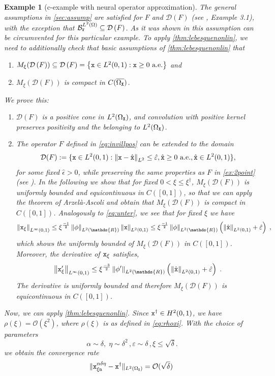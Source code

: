\documentclass[10pt]{article}
\numberwithin{equation}{section}
\newtheorem{example}[example]{Example}
\theoremstyle{nonumberplain}
\newcommand{\R}{\mathds{R}}
\newcommand{\dom}[1]{\mathcal{D}\left(#1\right)}
\newcommand{\norm}[1]{\left\|#1\right\|}
\newcommand{\norms}[1]{\|#1\|}
\newcommand{\set}[1]{\left\{#1\right\}}
\newcommand{\ve}{\varepsilon}
\newcommand{\X}{{\tt X}}
\newcommand{\n}{{\tt n}}
\newcommand{\x}{{\tt x}}
\newcommand{\xdag}{\x^\dagger}
\begin{document}
\begin{example}[c-example with neural operator approximation]
The general assumptions in \autoref{sec:assump} are satisfied for $F$ and $\dom{F}$ (see \cite{NeuSch90}, Example 3.1), with the exception that $\mathcal{B}_{\tt r}^{L^2(\Omega)} \subseteq \dom{F}$. As it was shown in \cite{NeuSch90} this assumption can be circumvented for this particular example. To apply \autoref{thm:lebesguenonlin}, we need to additionally check that basic assumptions of  \autoref{thm:lebesguenonlin} that 
\begin{enumerate}
	\item $M_\xi(\dom{F}) \subseteq \dom{F} = \set{\x \in L^2(0,1): \x \geq 0 \text{ a.e.} }$ and
	\item $M_\xi(\dom{F})$ is compact in $C(\overline{\Omega_\X})$.
\end{enumerate} 
We prove this: 
\begin{enumerate}
\item $\dom{F}$ is a positive cone in $L^2(\Omega_\X)$, and convolution with positive kernel preserves positivity and the belonging to $L^2(\Omega_\X)$.
\item The operator $F$ defined in \autoref{eq:invillpos} can be extended to the domain
$$\mathcal{D}(F):= \{\x \in L^2(0,1) : \norm{\x - \hat{\x}}_{L^2} \leq \hat{\ve}, \hat{\x} \geq 0 \text{ a.e.}, \hat{\x} \in L^2(0,1)\},$$
for some fixed $ \hat{\epsilon} > 0$, while preserving the same properties as $F$ in \autoref{ex:2point} (see \cite{NeuSch90}). In the following we show that for fixed $0 < \xi \leq \xi^\dagger$, $M_\xi(\mathcal{D}(F))$ is uniformly bounded and equicontinuous in $C([0,1])$, so that we can apply the theorem of Arzel\`a-Ascoli \cite{Rud76} and obtain that $M_\xi(\mathcal{D}(F))$ is compact in $C([0,1])$. 
Analogously to \autoref{eq:unter}, we see that for fixed $\xi$ we have
$$\norm{\x_\xi}_{L^\infty(0,1)} \leq \xi^{\frac{-1}{2}}\norm{\phi}_{L^2(\R)}\norm{\x}_{L^2(0,1)} \leq \xi^{\frac{-1}{2}}\norm{\phi}_{L^2(\R)} \left( \norm{\hat{\x}}_{L^2(0,1)}  + \hat{\ve}\right)\;,$$
which shows the uniformly bounded of $M_\xi(\dom{F})$ in $C([0,1])$. Moreover, the derivative of $\x_\xi$ satisfies,
$$\norm{\x_\xi'}_{L^\infty(0,1)} \leq \xi^{\frac{-3}{2}}\norm{\phi'}_{L^2(\R)} \left( \norm{\hat{\x}}_{L^2(0,1)}  + \hat{\ve}\right)\;.$$
The derivative is uniformly bounded and therefore
$M_\xi(\mathcal{D}(F))$ is equicontinuous in $C([0,1])$.
\end{enumerate}

Now, we can apply \autoref{thm:lebesguenonlin}. Since $\xdag \in H^2(0,1)$, we have $\rho(\xi) = \mathcal{O}(\xi^2)$, where $\rho(\xi)$ is as defined in \autoref{eq:rhoxi}. With the choice of parameters
	\begin{equation*}
		\alpha \sim \delta, \; \eta \sim \delta^2 \,,  \ve \sim \delta \,, \xi \leq \sqrt{\delta}.
	\end{equation*}
    we obtain the convergence rate
    \begin{equation}
        \norms{\x_{\xi\n}^{\alpha\delta\eta} - \xdag}_{L^2(\Omega_\X)} = \mathcal{O}(\sqrt{\delta})\;
    \end{equation} 
\end{example}
 
\end{document}

